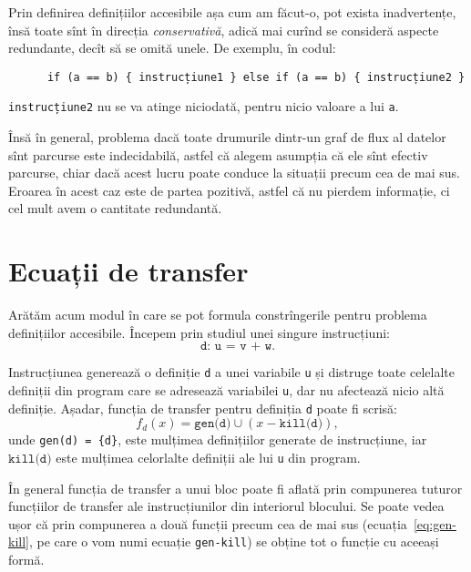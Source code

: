 \begin{remark}\label{rk:safe}
  Prin definirea definițiilor accesibile așa cum am făcut-o, pot exista
  inadvertențe, însă toate sînt în direcția \emph{conservativă}, adică mai curînd
  se consideră aspecte redundante, decît să se omită unele. De exemplu, în codul:
  \begin{center}
    \begin{BVerbatim}
      if (a == b) { instrucțiune1 } else if (a == b) { instrucțiune2 }
    \end{BVerbatim}
  \end{center}
  \texttt{instrucțiune2} nu se va atinge niciodată, pentru nicio valoare a lui \texttt{a}.

  Însă în general, problema dacă toate drumurile dintr-un graf de flux al datelor
  sînt parcurse este indecidabilă, astfel că alegem asumpția că ele sînt efectiv
  parcurse, chiar dacă acest lucru poate conduce la situații precum cea de mai
  sus. Eroarea în acest caz este de partea pozitivă, astfel că nu pierdem informație,
  ci cel mult avem o cantitate redundantă.
\end{remark}

\section{Ecuații de transfer}

Arătăm acum modul în care se pot formula constrîngerile pentru problema
definițiilor accesibile. Începem prin studiul unei singure instrucțiuni:
\[
  \texttt{d: u = v + w}.
\]

Instrucțiunea generează o definiție \texttt{d} a unei variabile \texttt{u}
și distruge toate celelalte definiții din program care se adresează
variabilei \texttt{u}, dar nu afectează nicio altă definiție. Așadar,
funcția de transfer pentru definiția \texttt{d} poate fi scrisă:
\begin{equation}
  \label{eq:gen-kill}
  f_d(x) = \texttt{gen(d)} \cup (x - \texttt{kill(d)}),
\end{equation}
unde \texttt{gen(d) = \{d\}}, este mulțimea definițiilor
generate de instrucțiune, iar $ \texttt{kill(d)} $ este mulțimea
celorlalte definiții ale lui \texttt{u} din program.

În general funcția de transfer a unui bloc poate fi aflată prin
compunerea tuturor funcțiilor de transfer ale instrucțiunilor din interiorul
blocului. Se poate vedea ușor că prin compunerea a două funcții precum
cea de mai sus (ecuația~\eqref{eq:gen-kill}, pe care o vom numi ecuație
\texttt{gen-kill}) se obține tot o funcție cu aceeași formă.

